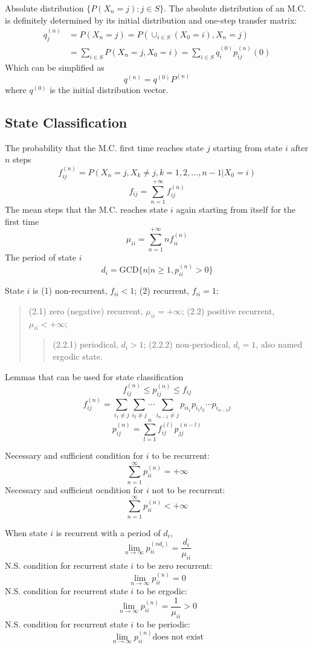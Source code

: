 Absolute distribution $\{P(X_n=j):j\in S\}$.
The absolute distribution of an M.C. is definitely determined by its
initial distribution and one-step transfer matrix:
\begin{align}
	q_j^{(n)} &= P(X_n=j) = P(\cup_{i\in S}(X_0=i), X_n=j)\\
	 &= \sum_{i\in S}P(X_n=j, X_0=i) = \sum_{i\in S}q_i^{(0)} p_{ij}^{(n)}(0)
\end{align}
Which can be simplified as
$$q^{(n)} = q^{(0)} P^{(n)}$$
where $q^{(0)}$ is the initial distribution vector.

\subsection{State Classification}

The probability that the M.C. first time reaches state $j$ starting from
state $i$ after $n$ steps
$$f_{ij}^{(n)} = P(X_n=j, X_k\neq j, k=1,2,\ldots,n-1 | X_0=i)$$
$$f_{ij} = \sum_{n=1}^{+\infty} f_{ij}^{(n)}$$
The mean steps that the M.C. reaches state $i$ again starting from itself for the first time
$$\mu_{ii} = \sum_{n=1}^{+\infty} n f_{ii}^{(n)}$$
The period of state $i$
$$d_i = \text{GCD}\{n | n \geq 1, p_{ii}^{(n)} > 0\}$$

State $i$ is (1) non-recurrent, $f_{ii} < 1$;
(2) recurrent, $f_{ii} = 1$; \begin{quote} (2.1) zero (negative) recurrent, $\mu_{ii} = +\infty$;
(2.2) positive recurrent, $\mu_{ii} < +\infty$; \begin{quote} (2.2.1) periodical, $d_i>1$;
(2.2.2) non-periodical, $d_i=1$, also named ergodic state. \end{quote}\end{quote}

Lemmas that can be used for state classification
$$f_{ij}^{(n)} \leq p_{ij}^{(n)} \leq f_{ij}$$
$$f_{ij}^{(n)} = \sum_{i_1 \neq j}\sum_{i_2 \neq j} \cdots \sum_{i_{n-1}\neq j} p_{ii_1}p_{i_1i_2}\cdots p_{i_{n-1}j}$$
$$p_{ij}^{(n)} = \sum_{l=1}^n f_{ij}^{(l)} p_{jj}^{(n-l)}$$

Necessary and sufficient condition for $i$ to be recurrent:
$$\sum_{n=1}^\infty p_{ii}^{(n)} = +\infty$$
Necessary and sufficient ocndition for $i$ not to be recurrent:
$$\sum_{n=1}^\infty p_{ii}^{(n)} < +\infty$$

When state $i$ is recurrent with a period of $d_i$,
$$\lim_{n\rightarrow\infty} p_{ii}^{(nd_i)} = \frac{d_i}{\mu_{ii}}$$
N.S. condition for recurrent state $i$ to be zero recurrent:
$$\lim_{n\rightarrow\infty} p_{ii}^{(n)} = 0$$
N.S. condition for recurrent state $i$ to be ergodic:
$$\lim_{n\rightarrow\infty} p_{ii}^{(n)} = \frac{1}{\mu_{ii}} > 0$$
N.S. condition for recurrent state $i$ to be periodic:
$$\lim_{n\rightarrow\infty} p_{ii}^{(n)} \text{does not exist}$$

